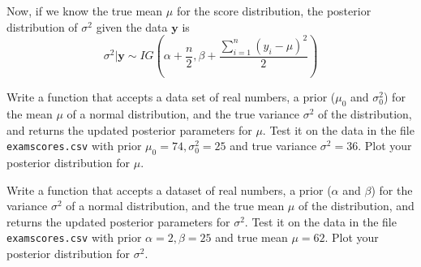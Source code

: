 Now, if we know the true mean $\mu$ for the score distribution, the posterior distribution of $\sigma^{2}$ given the data $\mathbf{y}$ is 
\begin{equation*}
\sigma^{2} | \mathbf{y} \sim IG \left(\alpha + \frac{n}{2}, \beta + \frac{\sum_{i=1}^{n} (y_{i} - \mu)^{2}}{2}\right)
\end{equation*}

\begin{problem}
Write a function that accepts a data set of real numbers, a prior ($\mu_{0}$ and $\sigma_{0}^{2}$) for the mean $\mu$ of a normal distribution, and the true variance $\sigma^{2}$ of the distribution, and returns the updated posterior parameters for $\mu$. Test it on the data in the file \texttt{examscores.csv} with prior $\mu_{0} = 74, \sigma_{0}^{2} = 25$ and true variance $\sigma^{2} = 36$. Plot your posterior distribution for $\mu$.
\end{problem}

\begin{problem}
Write a function that accepts a dataset of real numbers, a prior ($\alpha$ and $\beta$) for the variance $\sigma^{2}$ of a normal distribution, and the true mean $\mu$ of the distribution, and returns the updated posterior parameters for $\sigma^{2}$. Test it on the data in the file \texttt{examscores.csv} with prior $\alpha=2, \beta = 25$ and true mean $\mu = 62$. Plot your posterior distribution for $\sigma^{2}$.
\end{problem}